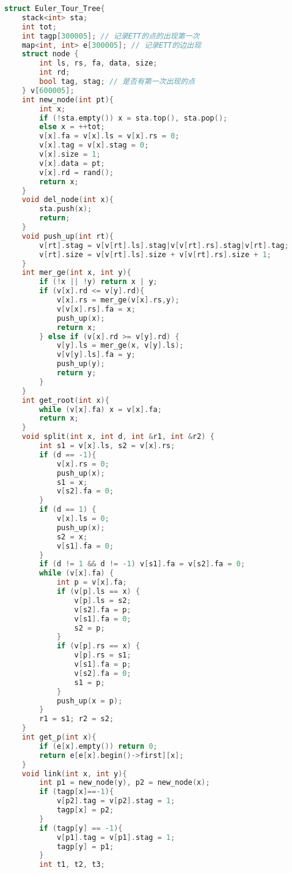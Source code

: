 \begin{lstlisting}[language=C++]
struct Euler_Tour_Tree{
    stack<int> sta;
    int tot;
    int tagp[300005]; // 记录ETT的点的出现第一次
    map<int, int> e[300005]; // 记录ETT的边出现
    struct node {
        int ls, rs, fa, data, size;
        int rd;
        bool tag, stag; // 是否有第一次出现的点
    } v[600005];
    int new_node(int pt){
        int x;
        if (!sta.empty()) x = sta.top(), sta.pop();
        else x = ++tot;
        v[x].fa = v[x].ls = v[x].rs = 0;
        v[x].tag = v[x].stag = 0;
        v[x].size = 1;
        v[x].data = pt;
        v[x].rd = rand();
        return x;
    }
    void del_node(int x){
        sta.push(x);
        return;
    }
    void push_up(int rt){
        v[rt].stag = v[v[rt].ls].stag|v[v[rt].rs].stag|v[rt].tag;
        v[rt].size = v[v[rt].ls].size + v[v[rt].rs].size + 1;
    }
    int mer_ge(int x, int y){
        if (!x || !y) return x | y;
        if (v[x].rd <= v[y].rd){
            v[x].rs = mer_ge(v[x].rs,y);
            v[v[x].rs].fa = x;
            push_up(x);
            return x;
        } else if (v[x].rd >= v[y].rd) {
            v[y].ls = mer_ge(x, v[y].ls);
            v[v[y].ls].fa = y;
            push_up(y);
            return y;
        }
    }
    int get_root(int x){
        while (v[x].fa) x = v[x].fa;
        return x;
    }
    void split(int x, int d, int &r1, int &r2) {
        int s1 = v[x].ls, s2 = v[x].rs;
        if (d == -1){
            v[x].rs = 0;
            push_up(x);
            s1 = x;
            v[s2].fa = 0;
        }
        if (d == 1) {
            v[x].ls = 0;
            push_up(x);
            s2 = x;
            v[s1].fa = 0;
        }
        if (d != 1 && d != -1) v[s1].fa = v[s2].fa = 0;
        while (v[x].fa) {
            int p = v[x].fa;
            if (v[p].ls == x) {
                v[p].ls = s2;
                v[s2].fa = p;
                v[s1].fa = 0;
                s2 = p;
            }
            if (v[p].rs == x) {
                v[p].rs = s1;
                v[s1].fa = p;
                v[s2].fa = 0;
                s1 = p;
            }
            push_up(x = p);
        }
        r1 = s1; r2 = s2;
    }
    int get_p(int x){
        if (e[x].empty()) return 0;
        return e[e[x].begin()->first][x];
    }
    void link(int x, int y){
        int p1 = new_node(y), p2 = new_node(x);
        if (tagp[x]==-1){
            v[p2].tag = v[p2].stag = 1;
            tagp[x] = p2;
        }
        if (tagp[y] == -1){
            v[p1].tag = v[p1].stag = 1;
            tagp[y] = p1;
        }
        int t1, t2, t3;

\end{lstlisting}
